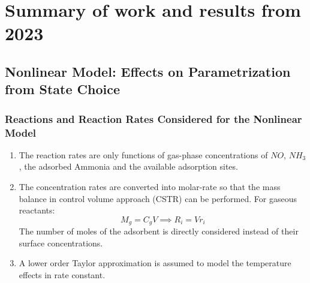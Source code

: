 \section{Summary of work and results from 2023}

\subsection{Nonlinear Model: Effects on Parametrization from State Choice}

\subsubsection{Reactions and Reaction Rates Considered for the Nonlinear Model}
\begin{enumerate}
\item The reaction rates are only functions of gas-phase concentrations of $NO$,
$NH_3$, the adsorbed Ammonia and the available adsorption sites.

\item The concentration rates are converted into molar-rate so that the
mass balance in control volume approach (CSTR) can be performed. For gaseous reactants:
$$ M_g = C_g V \implies R_i = V r_i $$
The number of moles of the adsorbent is directly considered instead of their
surface concentrations.

\item A lower order Taylor approximation is assumed to model the temperature
effects in rate constant.
\end{enumerate}

